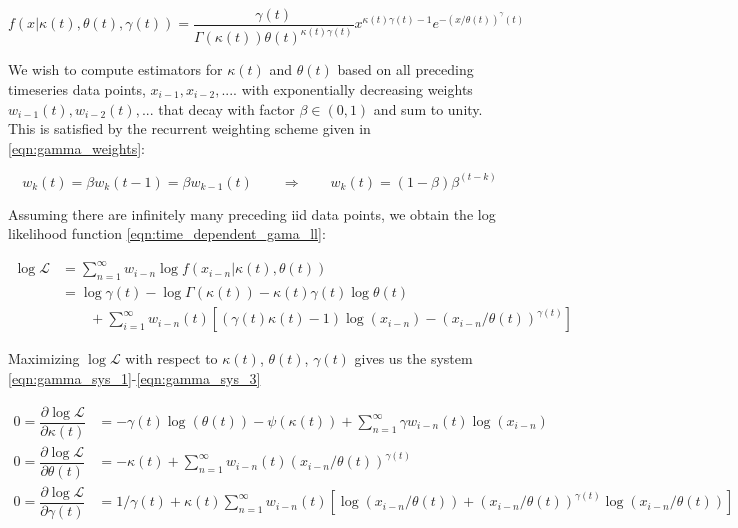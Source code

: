 \documentclass[12pt]{article}
\begin{document}
\begin{equation}
f(x|\kappa(t), \theta(t), \gamma(t)) = \frac{\gamma(t)}{\Gamma(\kappa(t))\theta(t)^{\kappa(t)\gamma(t)}} x^{\kappa(t)\gamma(t)-1}e^{-(x/\theta(t))^\gamma(t)}
\end{equation}

\noindent We wish to compute estimators for $\kappa(t)$ and $\theta(t)$ based on all preceding timeseries data points, $x_{i-1}, x_{i-2}, ....$ with exponentially decreasing weights $w_{i-1}(t), w_{i-2}(t), ...$ that decay with factor $\beta \in (0, 1)$ and sum to unity. This is satisfied by the recurrent weighting scheme given in \eqref{eqn:gamma_weights}:

\begin{equation}
w_{k}(t) = \beta w_{k}(t-1) = \beta w_{k-1}(t) \qquad\Rightarrow\qquad w_{k}(t) = (1-\beta)\beta^{(t-k)}
\label{eqn:gamma_weights}
\end{equation} 

\noindent Assuming there are infinitely many preceding iid data points, we obtain the log likelihood function \eqref{eqn:time_dependent_gama_ll}:

\begin{align}
\log \mathcal{L} & = \sum_{n=1}^\infty w_{i-n}\log f(x_{i-n}|\kappa(t), \theta(t)) \nonumber\\
& = \log \gamma(t) - \log\Gamma(\kappa(t)) - \kappa(t)\gamma(t)\log \theta(t) \nonumber \\ 
& \qquad +\sum_{i=1}^\infty w_{i-n}(t)[(\gamma(t)\kappa(t) - 1)\log(x_{i-n}) - (x_{i-n}/\theta(t))^{\gamma(t)}]
\label{eqn:time_dependent_gama_ll}
\end{align}

\noindent Maximizing $\log\mathcal{L}$ with respect to $\kappa(t)$, $\theta(t)$, $\gamma(t)$ gives us the system \eqref{eqn:gamma_sys_1}-\eqref{eqn:gamma_sys_3}

\begin{align}
0 = \dfrac{\partial \log\mathcal{L}}{\partial \kappa(t)} &= -\gamma(t)\log(\theta(t)) - \psi(\kappa(t)) + \sum_{n=1}^\infty \gamma w_{i-n}(t) \log(x_{i-n})  \label{eqn:gamma_sys_1}\\
0 = \dfrac{\partial \log\mathcal{L}}{\partial \theta(t)} &= -\kappa(t) + \sum_{n=1}^\infty w_{i-n}(t) (x_{i-n}/\theta(t))^{\gamma(t)} \label{eqn:gamma_sys_2}\\
0 = \dfrac{\partial \log\mathcal{L}}{\partial \gamma(t)} &= 1/\gamma(t) + \kappa(t)\sum_{n=1}^\infty w_{i-n}(t)\left[ \log(x_{i-n}/\theta(t)) + (x_{i-n}/\theta(t))^{\gamma(t)}\log(x_{i-n}/\theta(t)) \right] \label{eqn:gamma_sys_3}
\end{align}
\end{document}
